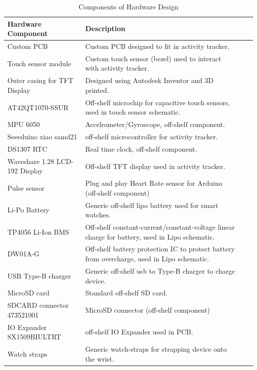 \documentclass[12pt, titlepage]{article}
\begin{document}
\begin{table}[H]
	\begin{tabularx}{1.05\textwidth} { 
		  | >{\centering\arraybackslash}X 
		  | >{\centering\arraybackslash}X 
		  | >{\centering\arraybackslash}X 
		  | >{\centering\arraybackslash}X | }
		 \hline
		 \textbf{Hardware Component} & \textbf{Description}\\
		 \hline
		Custom PCB & Custom PCB designed to fit in activity tracker.  \\
		\hline 
		Touch sensor module & Custom touch sensor (bezel) used to interact with activity tracker.\\
		\hline
		Outer casing for TFT Display & Designed using Autodesk Inventor and 3D printed. \\
		\hline 
		AT42QT1070-SSUR & Off-shelf microchip for capacitive touch sensors, used in touch sensor schematic.\\
		\hline
		 MPU 6050 & Accelrometer/Gyroscope, off-shelf component.\\
		\hline
		 Seeeduino xiao samd21  & off-shelf microcontroller for activity tracker.\\
		 \hline
		   DS1307 RTC & Real time clock, off-shelf component. \\
		\hline
		Waveshare 1.28 LCD-192 Display & Off-shelf TFT display used in activity tracker. \\
		\hline 
		Pulse sensor & Plug and play Heart Rate sensor for Arduino (off-shelf component)\\
		\hline 
		Li-Po Battery & Generic off-shelf lipo battery used for smart watches.  \\
		\hline 
		TP4056 Li-Ion BMS & Off-shelf constant-current/constant-voltage linear charge for battery, used in Lipo schematic.\\
		\hline
		DW01A-G & Off-shelf battery protection IC  to protect battery from overcharge, used in Lipo schematic.\\
		\hline
		USB Type-B charger & Generic off-shelf usb to Type-B charger to charge device. \\
		\hline 
		MicroSD card & Standard off-shelf SD card. \\
		\hline
		SDCARD connector 473521001& MicroSD connector (off-shelf component) \\
		\hline
		IO Expander SX1509BIULTRT & off-shelf IO Expander used in PCB.  \\
		\hline 
		Watch straps & Generic watch-straps for strapping device onto the wrist. \\
		\hline 
	\end{tabularx}
\caption{\label{DesignHardware}Components of Hardware Design}  
\end{table}
\end{document}
